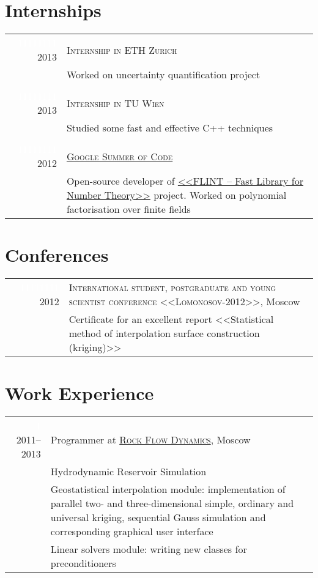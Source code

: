 \documentclass[a4paper,10pt]{article}
\begin{document}
\section{Internships}
\begin{tabular}{r|p{13cm}}
  \textcolor{white}{11111111} 2013 & \textsc{Internship in ETH Zurich} \\
 & \footnotesize Worked on uncertainty quantification project\\
  
 \multicolumn{2}{c}{} \\

\textcolor{white}{11111111} 2013 & \textsc{Internship in TU Wien} \\
 & \footnotesize Studied some fast and effective C++ techniques\\
  
 \multicolumn{2}{c}{} \\

 \textcolor{white}{11111111} 2012 & 
 \href{https://google-melange.appspot.com/gsoc/project/google/gsoc2012/kulakova_lina/26001}{\textsc{Google Summer of Code}}\\
 & \footnotesize{Open-source developer of \href{https://github.com/lina-kulakova/flint2}{<<FLINT -- Fast Library for Number Theory>>} project.
 Worked on polynomial factorisation over finite fields}
 
\end{tabular}

\section{Conferences}
\begin{tabular}{r|p{13cm}}
 \textcolor{white}{11111111} 2012 & \textsc{International student, postgraduate and young scientist conference <<Lomonosov-2012>>}, Moscow\\
 & \footnotesize{Certificate for an excellent report <<Statistical method of interpolation surface construction (kriging)>>}
\end{tabular}

\section{Work Experience}
\begin{tabular}{r|p{13cm}}
 \textcolor{white}{1} 2011--2013 & Programmer at \href{http://rfdyn.com/}{\textsc{Rock Flow Dynamics}}, Moscow \\
 & Hydrodynamic Reservoir Simulation\\
 & \footnotesize {Geostatistical interpolation module: implementation of parallel two- and three-dimensional simple, ordinary and universal kriging,
 sequential Gauss simulation and corresponding graphical user interface} \\
 &\footnotesize {Linear solvers module: writing new classes for preconditioners}\\
\end{tabular}
\end{document}
